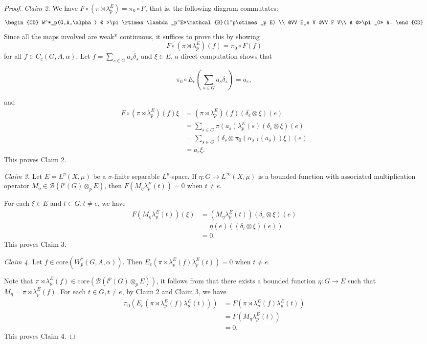 \documentclass[reqno,11pt]{amsart}
\theoremstyle{plain}
\theoremstyle{definition}
\theoremstyle{remark}
\begin{document}
\begin{proof}
{\it Claim 2.} We have $F\circ(\pi\rtimes\lambda_p^E)=\pi_0\circ F$, that is, the following diagram commutates:
$$\begin{CD}
  W^*_p(G,A,\alpha) @ >\pi\rtimes\lambda_p^E>>\mathcal{B}(l^p\otimes_p E) \\
     @VV E_e V @VV F V\\
    A @>\pi_0>> A.
\end{CD}$$
Since all the maps involved are weak* continuous, it suffices to prove this by showing $$F\circ(\pi\rtimes\lambda_p^E)(f)=\pi_0\circ F(f)$$ for all $f\in C_c(G,A,\alpha)$. Let $f=\sum_{s\in G}a_s\delta_s$ and $\xi\in E$, a direct computation shows that

$$\pi_0\circ E_e(\sum_{s\in G}a_s\delta_s)=a_e,$$

   and $$\begin{aligned} F\circ(\pi\rtimes\lambda_p^E)(f)\xi &=
(\pi\rtimes\lambda_p^E)(f)(\delta_e\otimes\xi)(e)
  \\ &=\sum_{s\in G}\pi(a_s)\lambda_p^E(s)(\delta_e\otimes\xi)(e)
   \\ &=\sum_{s\in G}(\delta_s\otimes \pi_0(\alpha_{s^{-1}}(a_s))\xi)(e)
   \\&=a_e\xi.\end{aligned}$$
This proves Claim 2.

{\it Claim 3.}
Let $E=L^p(X,\mu)$ be a $\sigma$-finite separable $L^p$-space. If $\eta:G\rightarrow L^\infty(X,\mu)$ is a bounded function with associated multiplication operator $M_\eta\in \mathcal{B}(l^p(G)\otimes_p E)$, then $F(M_\eta\lambda_p^E(t))=0$ when $t\neq e$.

For each $\xi\in E$ and $t\in G, t\neq e$, we have
$$\begin{aligned} F(M_\eta\lambda_p^E(t))(\xi) &=
(M_\eta\lambda_p^E(t))(\delta_e\otimes\xi)(e)
  \\ &=\eta(e)((\delta_t\otimes\xi)(e))
   \\ &=0.\end{aligned}$$
This proves Claim 3.

{\it Claim 4.} Let $f\in \mathrm{core}(W^*_p(G,A,\alpha))$. Then $E_e(\pi\rtimes\lambda_p^E(f)\lambda_p^E(t))=0$ when $t\neq e$.

Note that $\pi\rtimes\lambda_p^E(f)\in \mathrm{core}(\mathcal{B}(l^p(G)\otimes_p E))$, it follows from \cite[Example 2.11]{Choi and} that there exists a bounded function $\eta:G\rightarrow E$ such that $M_\eta=\pi\rtimes\lambda_p^E(f)$. For each $t\in G, t\neq e$,
by Claim 2 and Claim 3, we have $$\begin{aligned} \pi_0(E_e(\pi\rtimes\lambda_p^E(f)\lambda_p^E(t))) &=
F(\pi\rtimes\lambda_p^E(f)\lambda_p^E(t))
  \\ &=F(M_\eta\lambda_p^E(t))
   \\ &=0.\end{aligned}$$
This proves Claim 4.


\end{proof}
\end{document}
